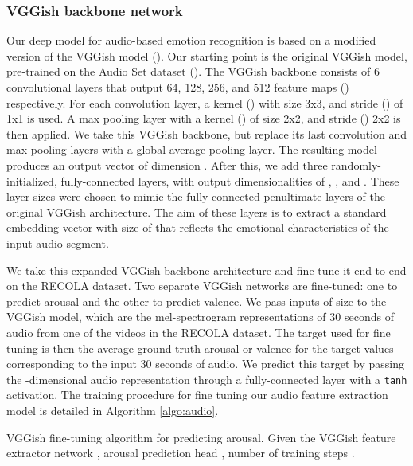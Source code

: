 \documentclass[times,twocolumn,final,authoryear]{elsarticle}
\begin{document}
	
	
	\subsubsection{VGGish backbone network}
	\label{sec:vggish}
	
	Our deep model for audio-based emotion recognition is based on a modified version of the VGGish model (\cite{Vggish2017}). Our starting point is the original VGGish model, pre-trained on the Audio Set dataset (\cite{audioSet}). The VGGish backbone consists of 6 convolutional layers that output 64, 128, 256, and 512 feature maps () respectively. For each convolution layer, a kernel () with size 3x3, and stride () of 1x1 is used. A max pooling layer with a kernel () of size 2x2, and stride () 2x2 is then applied. We take this VGGish backbone, but replace its last convolution and max pooling layers with a global average pooling layer. The resulting model produces an output vector of dimension . After this, we add three randomly-initialized, fully-connected layers, with output dimensionalities of , , and . These layer sizes were chosen to mimic the fully-connected penultimate layers of the original VGGish architecture. The aim of these layers is to extract a standard embedding vector with size of  that reflects the emotional characteristics of the input audio segment.
	
	We take this expanded VGGish backbone architecture and fine-tune it end-to-end on the RECOLA dataset. Two separate VGGish networks are fine-tuned: one to predict arousal and the other to predict valence. We pass inputs of size  to the VGGish model, which are the mel-spectrogram representations of 30 seconds of audio from one of the videos in the RECOLA dataset. The target used for fine tuning is then the average ground truth arousal or valence for the target values corresponding to the input 30 seconds of audio. We predict this target by passing the -dimensional audio representation through a fully-connected layer  with a \texttt{tanh} activation. The training procedure for fine tuning our audio feature extraction model is detailed in Algorithm \ref{algo:audio}.
	
	\begin{algorithm2e}
		\SetAlgoLined
		\caption{VGGish fine-tuning algorithm for predicting arousal. Given the VGGish feature extractor network , arousal prediction head , number of training steps .}
		\label{algo:audio}
	\end{algorithm2e}
	
\end{document}
